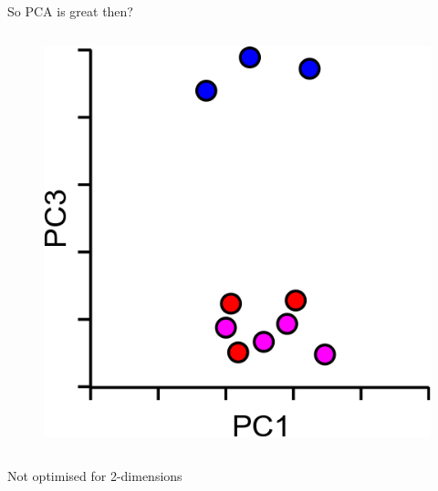 \begin{frame}[allowframebreaks]{So PCA is great then?}
\begin{columns}
\begin{column}{0.5\textwidth}
\begin{figure}
            \includegraphics[width=1\textwidth,keepaspectratio]{images/dul/dim-reduce/pca-nonlinear-optimised-2.png}
        \end{figure}
    \end{column}
    \end{columns}
    \begin{center}
        Not optimised for 2-dimensions
    \end{center}
\end{frame}